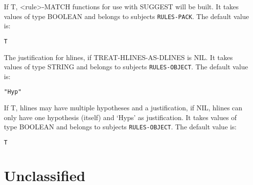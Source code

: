 \begin{description} 
\item[BUILD-MATCH]  
If T, <rule>-MATCH functions for use with SUGGEST will be built.
It takes values of type BOOLEAN and belongs to subjects \texttt{RULES-PACK}.  The default value is: \begin{lstlisting}
T
\end{lstlisting}

\item[HLINE-JUSTIFICATION]  
The justification for hlines, if TREAT-HLINES-AS-DLINES is NIL.
It takes values of type STRING and belongs to subjects \texttt{RULES-OBJECT}.  The default value is: \begin{lstlisting}
"Hyp"
\end{lstlisting}

\item[TREAT-HLINES-AS-DLINES]  
If T, hlines may have multiple hypotheses and a justification,
if NIL, hlines can only have one hypothesis (itself) and `Hyps' as
justification.
It takes values of type BOOLEAN and belongs to subjects \texttt{RULES-OBJECT}.  The default value is: \begin{lstlisting}
T
\end{lstlisting}

\item
\end{description}

\section{Unclassified}

